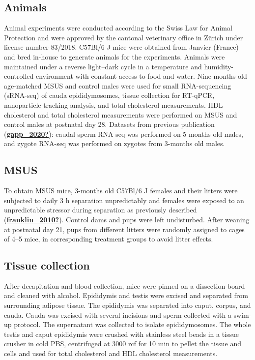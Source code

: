 \documentclass[12pt,twoside]{reedthesis}
\begin{document}
\hypertarget{animals}{%
\subsection{Animals}\label{animals}}

Animal experiments were conducted according to the Swiss Law for Animal
Protection and were approved by the cantonal veterinary office in Zürich
under license number 83/2018. C57Bl/6 J mice were obtained from Janvier
(France) and bred in-house to generate animals for the experiments.
Animals were maintained under a reverse light--dark cycle in a
temperature and humidity-controlled environment with constant access to
food and water. Nine months old age-matched MSUS and control males were
used for small RNA-sequencing (sRNA-seq) of cauda epididymosomes, tissue
collection for RT-qPCR, nanoparticle-tracking analysis, and total
cholesterol measurements. HDL cholesterol and total cholesterol
measurements were performed on MSUS and control males at postnatal day
28. Datasets from previous publication (\protect\hyperlink{ref-gapp_2020}{\textbf{gapp\_2020?}}): caudal sperm
RNA-seq was performed on 5-months old males, and zygote RNA-seq was
performed on zygotes from 3-months old males.

\hypertarget{msus}{%
\subsection{MSUS}\label{msus}}

To obtain MSUS mice, 3-months old C57Bl/6 J females and their litters
were subjected to daily 3 h separation unpredictably and females were
exposed to an unpredictable stressor during separation as previously
described (\protect\hyperlink{ref-franklin_2010}{\textbf{franklin\_2010?}}). Control dams and pups were left undisturbed.
After weaning at postnatal day 21, pups from different litters were
randomly assigned to cages of 4--5 mice, in corresponding treatment
groups to avoid litter effects.

\hypertarget{tissue-collection}{%
\subsection{Tissue collection}\label{tissue-collection}}

After decapitation and blood collection, mice were pinned on a
dissection board and cleaned with alcohol. Epididymis and testis were
excised and separated from surrounding adipose tissue. The epididymis
was separated into caput, corpus, and cauda. Cauda was excised with
several incisions and sperm collected with a swim-up protocol. The
supernatant was collected to isolate epididymosomes. The whole testis
and caput epididymis were crushed with stainless steel beads in a tissue
crusher in cold PBS, centrifuged at 3000 rcf for 10 min to pellet the
tissue and cells and used for total cholesterol and HDL cholesterol
measurements.
\end{document}

